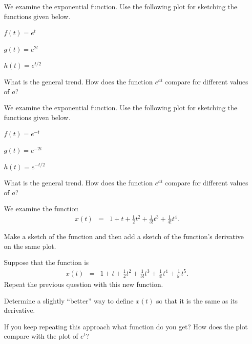 \begin{problem}
\item We examine the exponential function. Use the following plot for
  sketching the functions given below.

  \scalebox{0.75}{}

  \begin{subproblem}
  \item $f(t) = e^t$
  \item $g(t) = e^{2t}$
  \item $h(t) = e^{t/2}$
  \item What is the general trend. How does the function $e^{at}$
    compare for different values of $a$?
  \end{subproblem}

  \clearpage

\item We examine the exponential function. Use the following plot for
  sketching the functions given below.

  \scalebox{0.75}{}

  \begin{subproblem}
  \item $f(t) = e^{-t}$
  \item $g(t) = e^{-2t}$
  \item $h(t) = e^{-t/2}$
  \item What is the general trend. How does the function $e^{at}$
    compare for different values of $a$?
  \end{subproblem}


  \clearpage
\item We examine the function
  \begin{eqnarray*}
    x(t) & = & 1 + t + \frac{1}{2} t^2 + \frac{1}{3!} t^3 + \frac{1}{4!} t^4.
  \end{eqnarray*}
  \begin{subproblem}
  \item Make a sketch of the function and then add a sketch of the
    function's derivative on the same plot.
    \vfill
  \item Suppose that the function is   
    \begin{eqnarray*}
      x(t) & = & 1 + t + \frac{1}{2} t^2 + \frac{1}{3!} t^3 +
                 \frac{1}{4!} t^4 + \frac{1}{5!} t^5.
    \end{eqnarray*}
    Repeat the previous question with this new function. 
    \vfill

    \clearpage
  \item Determine a slightly ``better'' way to define $x(t)$ so that
    it is the same as its derivative.  
    \vfill

  \item If you keep repeating this approach what function do you get?
    How does the plot compare with the plot of $e^t$?
    \vspace{2em}
  \end{subproblem}
\end{problem}

